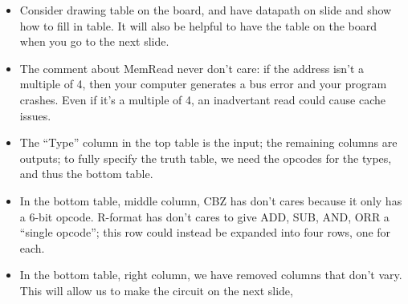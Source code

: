 \begin{frame}[fragile]
\begin{itemize}
\item Consider drawing table on the board, and have datapath on slide
and show how to fill in table.  It will also be helpful to have the
table on the board when you go to the next slide.

\item The comment about MemRead never don't care: if the address isn't a multiple of 4, then your computer generates a bus error and your program crashes.  Even if it's a multiple of 4, an inadvertant read could cause cache issues.
  
\item The ``Type'' column in the top table is the input; the remaining
  columns are outputs; to fully specify the truth table, we need the
  opcodes for the types, and thus the bottom table.
  
\item In the bottom table, middle column, CBZ has don't cares because
  it only has a 6-bit opcode. R-format has don't cares to give ADD,
  SUB, AND, ORR a ``single opcode''; this row could instead be
  expanded into four rows, one for each.
  
\item In the bottom table, right column, we have removed columns that
  don't vary.  This will allow us to make the circuit on the next slide,
\end{itemize}
\fi\ENotes
\end{frame}


    
   
  
